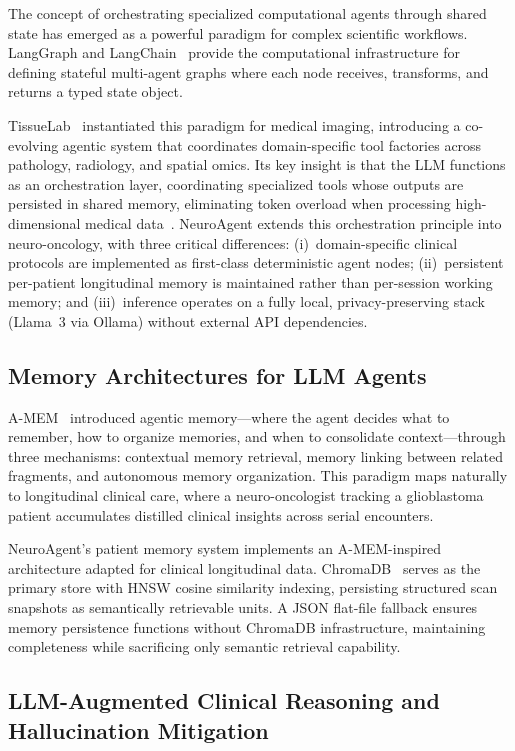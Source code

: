 \documentclass[journal]{IEEEtran}
\begin{document}
The concept of orchestrating specialized computational agents through
shared state has emerged as a powerful paradigm for complex scientific
workflows. LangGraph and LangChain~\cite{langchain2024} provide the
computational infrastructure for defining stateful multi-agent graphs
where each node receives, transforms, and returns a typed state object.

TissueLab~\cite{tissulab2025} instantiated this paradigm for medical
imaging, introducing a co-evolving agentic system that coordinates
domain-specific tool factories across pathology, radiology, and spatial
omics. Its key insight is that the LLM functions as an orchestration layer,
coordinating specialized tools whose outputs are persisted in shared memory,
eliminating token overload when processing high-dimensional medical
data~\cite{liu2024}. NeuroAgent extends this orchestration principle into
neuro-oncology, with three critical differences: (i)~domain-specific
clinical protocols are implemented as first-class deterministic agent
nodes; (ii)~persistent per-patient longitudinal memory is maintained rather
than per-session working memory; and (iii)~inference operates on a fully
local, privacy-preserving stack (Llama~3 via Ollama) without external API
dependencies.

\subsection{Memory Architectures for LLM Agents}

A-MEM~\cite{amem2024} introduced agentic memory---where the agent decides
what to remember, how to organize memories, and when to consolidate
context---through three mechanisms: contextual memory retrieval, memory
linking between related fragments, and autonomous memory organization.
This paradigm maps naturally to longitudinal clinical care, where a
neuro-oncologist tracking a glioblastoma patient accumulates distilled
clinical insights across serial encounters.

NeuroAgent's patient memory system implements an A-MEM-inspired
architecture adapted for clinical longitudinal data. ChromaDB~\cite{chroma2024}
serves as the primary store with HNSW cosine similarity indexing,
persisting structured scan snapshots as semantically retrievable units.
A JSON flat-file fallback ensures memory persistence functions without
ChromaDB infrastructure, maintaining completeness while sacrificing only
semantic retrieval capability.

\subsection{LLM-Augmented Clinical Reasoning and Hallucination Mitigation}
\end{document}
